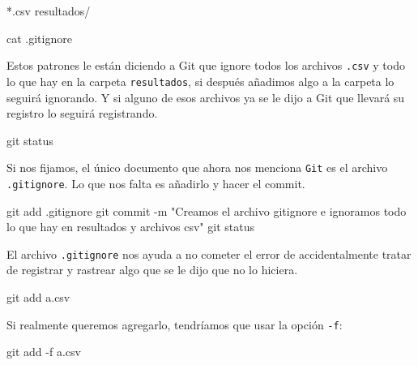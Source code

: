 \documentclass[
  spanish,
  12pt,
  letterpaper,
  DIV=11,
  numbers=noendperiod]{scrreprt}
\newenvironment{Shaded}{\begin{snugshade}}{\end{snugshade}}
\newcommand{\AttributeTok}[1]{\textcolor[rgb]{0.40,0.45,0.13}{#1}}
\newcommand{\ExtensionTok}[1]{\textcolor[rgb]{0.00,0.23,0.31}{#1}}
\newcommand{\FunctionTok}[1]{\textcolor[rgb]{0.28,0.35,0.67}{#1}}
\newcommand{\NormalTok}[1]{\textcolor[rgb]{0.00,0.23,0.31}{#1}}
\newcommand{\StringTok}[1]{\textcolor[rgb]{0.13,0.47,0.30}{#1}}
\begin{document}
\begin{Shaded}
\begin{Highlighting}[]
\ExtensionTok{*.csv}
\ExtensionTok{resultados/}
\end{Highlighting}
\end{Shaded}

\begin{Shaded}
\begin{Highlighting}[]
\FunctionTok{cat}\NormalTok{ .gitignore}
\end{Highlighting}
\end{Shaded}

Estos patrones le están diciendo a Git que ignore todos los archivos
\texttt{.csv} y todo lo que hay en la carpeta \texttt{resultados}, si
después añadimos algo a la carpeta lo seguirá ignorando. Y si alguno de
esos archivos ya se le dijo a Git que llevará su registro lo seguirá
registrando.

\begin{Shaded}
\begin{Highlighting}[]
\FunctionTok{git}\NormalTok{ status}
\end{Highlighting}
\end{Shaded}

Si nos fijamos, el único documento que ahora nos menciona \texttt{Git}
es el archivo \texttt{.gitignore}. Lo que nos falta es añadirlo y hacer
el commit.

\begin{Shaded}
\begin{Highlighting}[]
\FunctionTok{git}\NormalTok{ add .gitignore}
\FunctionTok{git}\NormalTok{ commit }\AttributeTok{{-}m} \StringTok{"Creamos el archivo gitignore e ignoramos todo lo que hay en resultados y archivos csv"}
\FunctionTok{git}\NormalTok{ status}
\end{Highlighting}
\end{Shaded}

El archivo \texttt{.gitignore} nos ayuda a no cometer el error de
accidentalmente tratar de registrar y rastrear algo que se le dijo que
no lo hiciera.

\begin{Shaded}
\begin{Highlighting}[]
\FunctionTok{git}\NormalTok{ add a.csv}
\end{Highlighting}
\end{Shaded}

Si realmente queremos agregarlo, tendríamos que usar la opción
\texttt{-f}:

\begin{Shaded}
\begin{Highlighting}[]
\FunctionTok{git}\NormalTok{ add }\AttributeTok{{-}f}\NormalTok{ a.csv}
\end{Highlighting}
\end{Shaded}
\end{document}

